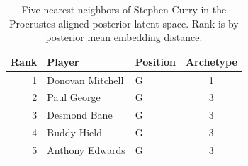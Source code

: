 \begin{table}[htbp]
  \centering\small
  \begin{tabular}{rllc}
    \toprule
    Rank & Player & Position & Archetype \\
    \midrule
    1 & Donovan Mitchell & G & 1 \\
    2 & Paul George & G & 3 \\
    3 & Desmond Bane & G & 3 \\
    4 & Buddy Hield & G & 3 \\
    5 & Anthony Edwards & G & 3 \\
    \bottomrule
  \end{tabular}
  \caption{Five nearest neighbors of Stephen Curry in the Procrustes-aligned posterior latent space. Rank is by posterior mean embedding distance.}
  \label{tab:Stephen_Curry_neighbors}
\end{table}

